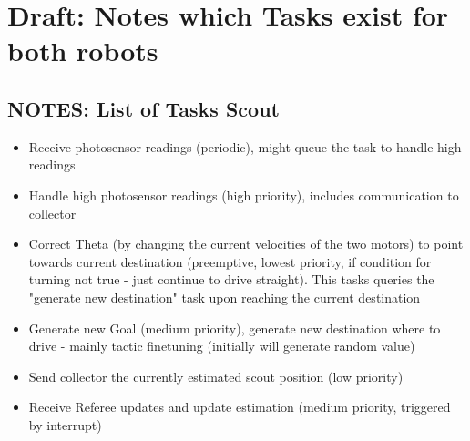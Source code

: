 \documentclass[12pt]{article}
\begin{document}
\lstset{language=C++}

\section*{Draft: Notes which Tasks exist for both robots}

\subsection*{NOTES: List of Tasks Scout}
\begin{itemize}
  \item Receive photosensor readings (periodic), might queue the task to handle high readings
  \item Handle high photosensor readings (high priority), includes communication to collector
  \item Correct Theta (by changing the current velocities of the two motors) to point towards current destination (preemptive, lowest priority, if condition for turning not true - just continue to drive straight). This tasks queries the "generate new destination" task upon reaching the current destination
  \item Generate new Goal (medium priority), generate new destination where to drive - mainly tactic finetuning (initially will generate random value)
  \item Send collector the currently estimated scout position (low priority)
  \item Receive Referee updates and update estimation (medium priority, triggered by interrupt)
\end{itemize}
\end{document}
